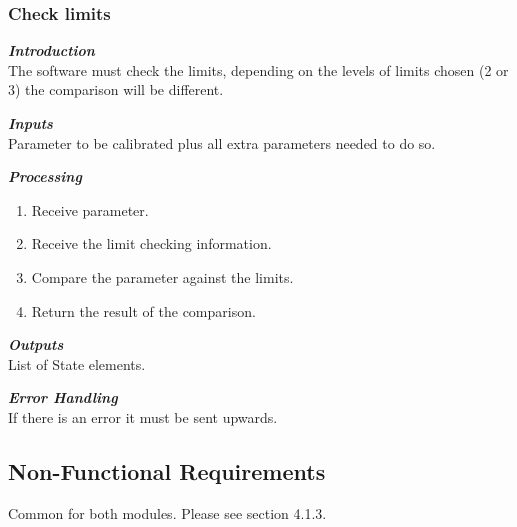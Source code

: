 \subsubsection{Check limits}

\textbf{\emph{Introduction}}\\

The software must check the limits, depending on the levels of limits chosen (2 or 3) the comparison will be different.


\textbf{\emph{Inputs}}\\

Parameter to be calibrated plus all extra parameters needed to do so.

\textbf{\emph{Processing}}\\
\begin{enumerate}
\item Receive parameter.
\item Receive the limit checking information.
\item Compare the parameter against the limits.
\item Return the result of the comparison.
\end{enumerate}

\textbf{\emph{Outputs}}\\
List of State elements.


\textbf{\emph{Error Handling}}\\
If there is an error it must be sent upwards.


\subsection{Non-Functional Requirements}

Common for both modules. Please see section 4.1.3.



\newpage

